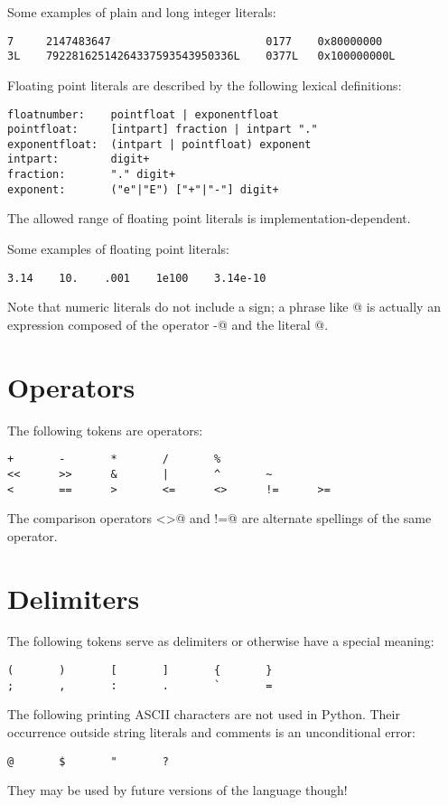 Some examples of plain and long integer literals:

\begin{verbatim}
7     2147483647                        0177    0x80000000
3L    79228162514264337593543950336L    0377L   0x100000000L
\end{verbatim}

Floating point literals are described by the following lexical
definitions:

\begin{verbatim}
floatnumber:    pointfloat | exponentfloat
pointfloat:     [intpart] fraction | intpart "."
exponentfloat:  (intpart | pointfloat) exponent
intpart:        digit+
fraction:       "." digit+
exponent:       ("e"|"E") ["+"|"-"] digit+
\end{verbatim}

The allowed range of floating point literals is
implementation-dependent.

Some examples of floating point literals:

\begin{verbatim}
3.14    10.    .001    1e100    3.14e-10
\end{verbatim}

Note that numeric literals do not include a sign; a phrase like
@ is actually an expression composed of the operator
\verb@-@ and the literal @.

\section{Operators}

The following tokens are operators:

\begin{verbatim}
+       -       *       /       %
<<      >>      &       |       ^       ~
<       ==      >       <=      <>      !=      >=
\end{verbatim}

The comparison operators \verb@<>@ and \verb@!=@ are alternate
spellings of the same operator.

\section{Delimiters}

The following tokens serve as delimiters or otherwise have a special
meaning:

\begin{verbatim}
(       )       [       ]       {       }
;       ,       :       .       `       =
\end{verbatim}

The following printing ASCII characters are not used in Python.  Their
occurrence outside string literals and comments is an unconditional
error:

\begin{verbatim}
@       $       "       ?
\end{verbatim}

They may be used by future versions of the language though!
